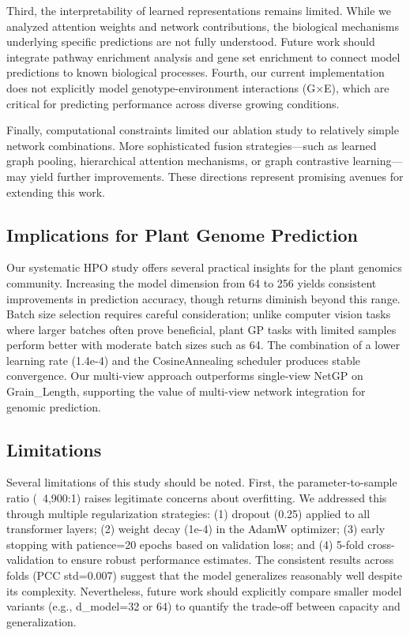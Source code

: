 \documentclass[11pt,a4paper]{article}
\begin{document}
Third, the interpretability of learned representations remains limited. While we analyzed attention weights and network contributions, the biological mechanisms underlying specific predictions are not fully understood. Future work should integrate pathway enrichment analysis and gene set enrichment to connect model predictions to known biological processes. Fourth, our current implementation does not explicitly model genotype-environment interactions (G×E), which are critical for predicting performance across diverse growing conditions.

Finally, computational constraints limited our ablation study to relatively simple network combinations. More sophisticated fusion strategies—such as learned graph pooling, hierarchical attention mechanisms, or graph contrastive learning—may yield further improvements. These directions represent promising avenues for extending this work.

\subsection{Implications for Plant Genome Prediction}
\label{subsec:implications}

Our systematic HPO study offers several practical insights for the plant genomics community. Increasing the model dimension from 64 to 256 yields consistent improvements in prediction accuracy, though returns diminish beyond this range. Batch size selection requires careful consideration; unlike computer vision tasks where larger batches often prove beneficial, plant GP tasks with limited samples perform better with moderate batch sizes such as 64. The combination of a lower learning rate (1.4e-4) and the CosineAnnealing scheduler produces stable convergence. Our multi-view approach outperforms single-view NetGP on Grain\_Length, supporting the value of multi-view network integration for genomic prediction.

\subsection{Limitations}
\label{subsec:limitations}

Several limitations of this study should be noted. First, the parameter-to-sample ratio (~4,900:1) raises legitimate concerns about overfitting. We addressed this through multiple regularization strategies: (1) dropout (0.25) applied to all transformer layers; (2) weight decay (1e-4) in the AdamW optimizer; (3) early stopping with patience=20 epochs based on validation loss; and (4) 5-fold cross-validation to ensure robust performance estimates. The consistent results across folds (PCC std=0.007) suggest that the model generalizes reasonably well despite its complexity. Nevertheless, future work should explicitly compare smaller model variants (e.g., d\_model=32 or 64) to quantify the trade-off between capacity and generalization.
\end{document}
